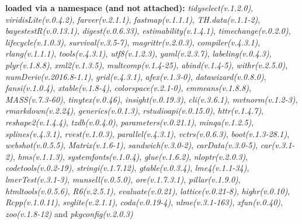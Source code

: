 \documentclass[
]{article}
\begin{document}
\textbf{loaded via a namespace (and not attached):}
\emph{tidyselect(v.1.2.0)}, \emph{viridisLite(v.0.4.2)},
\emph{farver(v.2.1.1)}, \emph{fastmap(v.1.1.1)},
\emph{TH.data(v.1.1-2)}, \emph{bayestestR(v.0.13.1)},
\emph{digest(v.0.6.33)}, \emph{estimability(v.1.4.1)},
\emph{timechange(v.0.2.0)}, \emph{lifecycle(v.1.0.3)},
\emph{survival(v.3.5-7)}, \emph{magrittr(v.2.0.3)},
\emph{compiler(v.4.3.1)}, \emph{rlang(v.1.1.1)}, \emph{tools(v.4.3.1)},
\emph{utf8(v.1.2.3)}, \emph{yaml(v.2.3.7)}, \emph{labeling(v.0.4.3)},
\emph{plyr(v.1.8.8)}, \emph{xml2(v.1.3.5)}, \emph{multcomp(v.1.4-25)},
\emph{abind(v.1.4-5)}, \emph{withr(v.2.5.0)},
\emph{numDeriv(v.2016.8-1.1)}, \emph{grid(v.4.3.1)},
\emph{afex(v.1.3-0)}, \emph{datawizard(v.0.8.0)}, \emph{fansi(v.1.0.4)},
\emph{xtable(v.1.8-4)}, \emph{colorspace(v.2.1-0)},
\emph{emmeans(v.1.8.8)}, \emph{MASS(v.7.3-60)}, \emph{tinytex(v.0.46)},
\emph{insight(v.0.19.3)}, \emph{cli(v.3.6.1)}, \emph{mvtnorm(v.1.2-3)},
\emph{rmarkdown(v.2.24)}, \emph{generics(v.0.1.3)},
\emph{rstudioapi(v.0.15.0)}, \emph{httr(v.1.4.7)},
\emph{reshape2(v.1.4.4)}, \emph{tzdb(v.0.4.0)},
\emph{parameters(v.0.21.1)}, \emph{minqa(v.1.2.5)},
\emph{splines(v.4.3.1)}, \emph{rvest(v.1.0.3)},
\emph{parallel(v.4.3.1)}, \emph{vctrs(v.0.6.3)},
\emph{boot(v.1.3-28.1)}, \emph{webshot(v.0.5.5)},
\emph{Matrix(v.1.6-1)}, \emph{sandwich(v.3.0-2)},
\emph{carData(v.3.0-5)}, \emph{car(v.3.1-2)}, \emph{hms(v.1.1.3)},
\emph{systemfonts(v.1.0.4)}, \emph{glue(v.1.6.2)},
\emph{nloptr(v.2.0.3)}, \emph{codetools(v.0.2-19)},
\emph{stringi(v.1.7.12)}, \emph{gtable(v.0.3.4)}, \emph{lme4(v.1.1-34)},
\emph{lmerTest(v.3.1-3)}, \emph{munsell(v.0.5.0)},
\emph{ore(v.1.7.3.1)}, \emph{pillar(v.1.9.0)},
\emph{htmltools(v.0.5.6)}, \emph{R6(v.2.5.1)}, \emph{evaluate(v.0.21)},
\emph{lattice(v.0.21-8)}, \emph{highr(v.0.10)}, \emph{Rcpp(v.1.0.11)},
\emph{svglite(v.2.1.1)}, \emph{coda(v.0.19-4)}, \emph{nlme(v.3.1-163)},
\emph{xfun(v.0.40)}, \emph{zoo(v.1.8-12)} and \emph{pkgconfig(v.2.0.3)}
\end{document}
